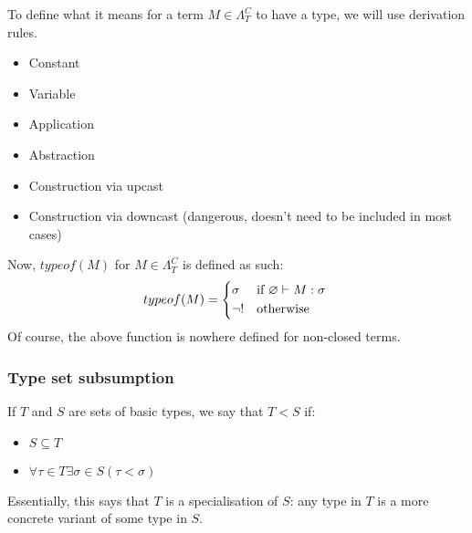 \documentclass[main.tex]{subfiles}
\begin{document}
\begin{defn}
    To define what it means for a term $M \in \Lambda_T^C$ to have a type,
    we will use derivation rules.
    \begin{itemize}
        \item Constant
        \item Variable
        \item Application
        \item Abstraction
        \item Construction via upcast
        \item Construction via downcast (dangerous, doesn't need to be included in most cases)
    \end{itemize}

    Now, $typeof(M)$ for $M \in \Lambda_T^C$ is defined as such:
    \[
        typeof(M) =
        \begin{cases*}
            \sigma & if $\varnothing \vdash M : \sigma$ \\
            \neg ! & otherwise
        \end{cases*}
    \]
    Of course, the above function is nowhere defined for non-closed terms.
\end{defn}

\subsubsection{Type set subsumption}
\begin{defn}
    If $T$ and $S$ are sets of basic types, we say that $T \less S$ if:
    \begin{itemize}
        \item $S \subseteq T$
        \item $\forall \tau \in T \exists \sigma \in S ( \tau \less \sigma )$
    \end{itemize}

    Essentially, this says that $T$ is a specialisation of $S$: any type in
    $T$ is a more concrete variant of some type in $S$.
\end{defn}
\end{document}
